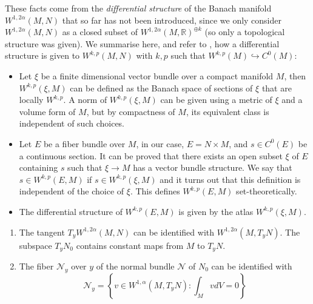 These facts come from the
\emph{differential structure} of the Banach manifold \(W^{1,2\alpha}(M,N)\) that so far has not
been introduced, since we only consider \(W^{1,2\alpha}(M,N)\) as a closed subset of \(W^{1,2\alpha}(M,\mathbb{R})^{\oplus k}\) (so only a topological structure was given). We
summarise here, and refer to \cite{palais_foundations_1968}, how a differential structure is given to \(W^{k,p}(M,N)\) with \(k,p\)
such that \(W^{k,p}(M) \hookrightarrow C^0(M)\):
\begin{itemize}
\item Let \(\xi\) be a finite dimensional vector bundle over a compact manifold \(M\),
then \(W^{k,p}(\xi,M)\) can be defined as the Banach space of sections of \(\xi\)
that are locally \(W^{k,p}\). A norm of \(W^{k,p}(\xi,M)\) can be given using a
metric of \(\xi\) and a volume form of \(M\), but by compactness of \(M\), its
equivalent class is independent of such choices.
\item Let \(E\) be a fiber bundle over \(M\), in our case, \(E = N\times M\), and \(s
  \in C^0(E)\) be a continuous section. It can be proved that there exists an open
subset \(\xi\) of \(E\) containing \(s\) such that \(\xi \to M\) has a vector
bundle structure. We say that \(s\in W^{k,p}(E,M)\) if \(s\in W^{k,p}(\xi,M)\) and
it turns out that this definition is independent of the choice of \(\xi\). This
defines \(W^{k,p}(E,M)\) set-theoretically.
\item The differential structure of \(W^{k,p}(E,M)\) is given by the atlas \(W^{k,p}(\xi,M)\).
\end{itemize}

\begin{remark}
\label{rem:tangent-palais}
\begin{enumerate}
\item The tangent \(T_y W^{1, 2\alpha}(M,N)\) can be identified with \(W^{1,2\alpha}(M, T_y
   N)\). The subspace \(T_y N_0\) contains constant maps from \(M\) to \(T_y N\).
\item The fiber \(\mathcal{N}_y\) over \(y\) of the normal bundle \(\mathcal{N}\) of \(N_0\) can be identified with
\[
    \mathcal{N}_y = \left\{v\in W^{1,\alpha}(M, T_y N): \int_M v dV = 0\right\}
   \]
\end{enumerate}
\end{remark}

